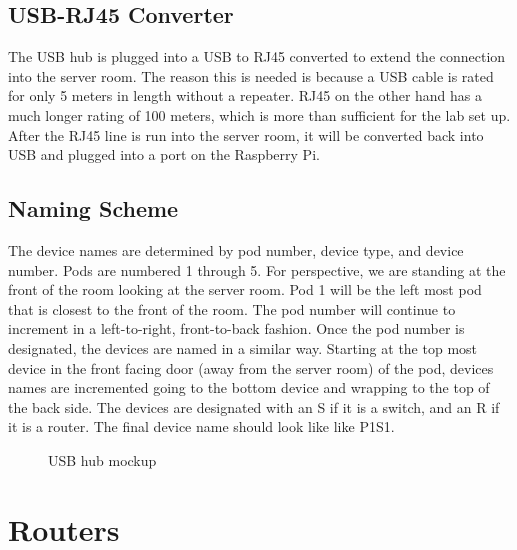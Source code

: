 \documentclass[12pt]{IEEEtran}
\begin{document}
\subsection{USB-RJ45 Converter}
The USB hub is plugged into a USB to RJ45 converted to extend the connection into the server room.
The reason this is needed is because a USB cable is rated for only 5 meters in length without a repeater.
RJ45 on the other hand has a much longer rating of 100 meters, which is more than sufficient for the lab set up.
After the RJ45 line is run into the server room, it will be converted back into USB and plugged into a port on the Raspberry Pi.

\subsection{Naming Scheme}
The device names are determined by pod number, device type, and device number.
Pods are numbered 1 through 5.
For perspective, we are standing at the front of the room looking at the server room.
Pod 1 will be the left most pod that is closest to the front of the room.
The pod number will continue to increment in a left-to-right, front-to-back fashion.
Once the pod number is designated, the devices are named in a similar way.
Starting at the top most device in the front facing door (away from the server room) of the pod, devices names are incremented going to the bottom device and wrapping to the top of the back side.
The devices are designated with an S if it is a switch, and an R if it is a router.
The final device name should look like like P1S1.


\begin{figure}[t]
	\centering
	\caption{USB hub mockup}

\end{figure}

\section{Routers}
\end{document}
